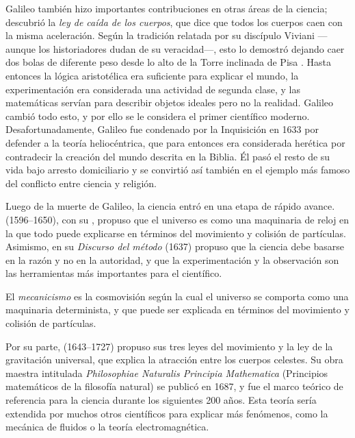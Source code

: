 Galileo también hizo importantes contribuciones en otras áreas de la ciencia; descubrió la \emph{ley de caída de los cuerpos}, que dice que todos los cuerpos caen con la misma aceleración.
Según la tradición relatada por su discípulo Viviani —aunque los historiadores dudan de su veracidad—, esto lo demostró dejando caer dos bolas de diferente peso desde lo alto de la Torre inclinada de Pisa \cite{Viviani2019}.
Hasta entonces la lógica aristotélica era suficiente para explicar el mundo, la experimentación era considerada una actividad de segunda clase, y las matemáticas servían para describir objetos ideales pero no la realidad.
Galileo cambió todo esto, y por ello se le considera el primer científico moderno.
Desafortunadamente, Galileo fue condenado por la Inquisición en 1633 por defender a la teoría heliocéntrica, que para entonces era considerada herética por contradecir la creación del mundo descrita en la Biblia.
Él pasó el resto de su vida bajo arresto domiciliario y se convirtió así también en el ejemplo más famoso del conflicto entre ciencia y religión.

Luego de la muerte de Galileo, la ciencia entró en una etapa de rápido avance.
 (1596--1650), con su , propuso que el universo es como una maquinaria de reloj en la que todo puede explicarse en términos del movimiento y colisión de partículas.
Asimismo, en su \emph{Discurso del método} (1637) propuso que la ciencia debe basarse en la razón y no en la autoridad, y que la experimentación y la observación son las herramientas más importantes para el científico.

\begin{remember}
	\label{rem:mecanicismo}
	El \emph{mecanicismo} es la cosmovisión según la cual el universo se comporta como una maquinaria determinista, y que puede ser explicada en términos del movimiento y colisión de partículas.
\end{remember}

Por su parte,  (1643--1727) propuso sus tres leyes del movimiento y la ley de la gravitación universal, que explica la atracción entre los cuerpos celestes.
Su obra maestra intitulada \emph{Philosophiae Naturalis Principia Mathematica} (Principios matemáticos de la filosofía natural) se publicó en 1687, y fue el marco teórico de referencia para la ciencia durante los siguientes 200 años.
Esta teoría sería extendida por muchos otros científicos para explicar más fenómenos, como la mecánica de fluidos o la teoría electromagnética.

